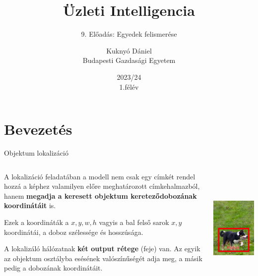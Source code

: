 \documentclass[english, aspectratio=169]{beamer}
\makeatletter
\newcommand\makebeamertitle{\frame{\maketitle}}
\let\origtableofcontents=\tableofcontents
\def\tableofcontents{\@ifnextchar[{\origtableofcontents}{\gobbletableofcontents}}
\def\gobbletableofcontents#1{\origtableofcontents}
\makeatother
\begin{document}
\section{Bevezetés}
\title[]{Üzleti Intelligencia}
\subtitle{9. Előadás: Egyedek felismerése}
\author[Kuknyó Dániel]{Kuknyó Dániel\\Budapesti Gazdasági Egyetem}
\date{2023/24\\1.félév}
\makebeamertitle

\begin{frame}
\tableofcontents{}
\end{frame}

\begin{frame}
\tableofcontents[currentsection]
\end{frame}

\begin{frame}{Objektum lokalizáció}
\begin{columns}
\begin{column}{.5\textwidth}
A lokalizáció feladatában a modell nem csak egy címkét rendel hozzá a képhez valamilyen előre meghatározott címkehalmazból, hanem \textbf{megadja a keresett objektum kereteződobozának koordinátáit} is.\par\smallskip
Ezek a koordináták a $x,y,w,h$ vagyis a bal felső sarok $x,y$ koordinátái, a doboz szélessége és hosszúsága.\par\smallskip
A lokalizáló hálózatnak \textbf{két output rétege} (feje) van. Az egyik az objektum osztályba esésének valószínűségét adja meg, a másik pedig a dobozának koordinátáit.
\end{column}
\begin{column}{.5\textwidth}
\begin{center}
\includegraphics[height=6cm, width=7cm, keepaspectratio]{images/instance_11.png}
\end{center}
\end{column}
\end{columns}
\end{frame}
\end{document}
